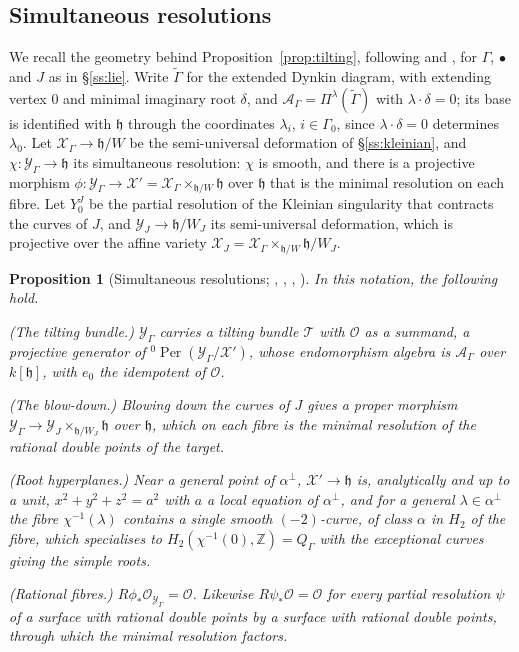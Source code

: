 \documentclass[11pt]{amsart}
\numberwithin{table}{section}
\numberwithin{figure}{section}
\numberwithin{equation}{section}
\newtheorem{prop}[thm]{Proposition}
\theoremstyle{definition}
\theoremstyle{plain}
\newcommand{\cA}{\mathcal{A}}
\newcommand{\cO}{\mathcal{O}}
\newcommand{\cX}{\mathcal{X}}
\newcommand{\cY}{\mathcal{Y}}
\newcommand{\h}{\mathfrak{h}}
\newcommand{\bul}{\bullet}
\newcommand{\tGamma}{\widetilde{\Gamma}}
\newcommand{\Z}{\mathbb{Z}}
\DeclareMathOperator{\Per}{Per}
\begin{document}
\subsection{Simultaneous resolutions}\label{ss:simres}

We recall the geometry behind Proposition~\ref{prop:tilting}, following \cite[\S2.3]{K} and \cite[4.2, 8.9]{Slo}, for $\Gamma$, $\bul$ and $J$ as in \S\ref{ss:lie}. Write $\tGamma$ for the extended Dynkin diagram, with extending vertex $0$ and minimal imaginary root $\delta$, and $\cA_\Gamma = \Pi^\lambda(\tGamma)$ with $\lambda\cdot\delta = 0$; its base is identified with $\h$ through the coordinates $\lambda_i$, $i \in \Gamma_0$, since $\lambda\cdot\delta = 0$ determines $\lambda_0$. Let $\cX_\Gamma \to \h/W$ be the semi-universal deformation of \S\ref{ss:kleinian}, and $\chi\colon \cY_\Gamma \to \h$ its simultaneous resolution: $\chi$ is smooth, and there is a projective morphism $\phi\colon \cY_\Gamma \to \cX' = \cX_\Gamma \times_{\h/W} \h$ over $\h$ that is the minimal resolution on each fibre. Let $Y_0^J$ be the partial resolution of the Kleinian singularity that contracts the curves of $J$, and $\cY_J \to \h/W_J$ its semi-universal deformation, which is projective over the affine variety $\cX_J = \cX_\Gamma \times_{\h/W} \h/W_J$.

\begin{prop}[{Simultaneous resolutions; \cite[\S\S2.3, 4.3--4.4, Thm~3.3, Prop~4.15]{K}, \cite[\S\S5, 7]{CS}, \cite[Example~8.10]{SMM}, \cite[Prop~2.2]{BKL}}]\label{prop:simres}
In this notation, the following hold.
\begin{thmlist}
\item (The tilting bundle.) $\cY_\Gamma$ carries a tilting bundle $\mathcal T$ with $\cO$ as a summand, a projective generator of ${}^0\Per(\cY_\Gamma/\cX')$, whose endomorphism algebra is $\cA_\Gamma$ over $k[\h]$, with $e_0$ the idempotent of $\cO$.
\item (The blow-down.) Blowing down the curves of $J$ gives a proper morphism $\cY_\Gamma \to \cY_J \times_{\h/W_J} \h$ over $\h$, which on each fibre is the minimal resolution of the rational double points of the target.
\item (Root hyperplanes.) Near a general point of $\alpha^\perp$, $\cX' \to \h$ is, analytically and up to a unit, $x^2 + y^2 + z^2 = a^2$ with $a$ a local equation of $\alpha^\perp$, and for a general $\lambda \in \alpha^\perp$ the fibre $\chi^{-1}(\lambda)$ contains a single smooth $(-2)$-curve, of class $\alpha$ in $H_2$ of the fibre, which specialises to $H_2(\chi^{-1}(0), \Z) = Q_\Gamma$ with the exceptional curves giving the simple roots.
\item (Rational fibres.) $R\phi_*\cO_{\cY_\Gamma} = \cO$. Likewise $R\psi_*\cO = \cO$ for every partial resolution $\psi$ of a surface with rational double points by a surface with rational double points, through which the minimal resolution factors.
\end{thmlist}
\end{prop}
\end{document}
